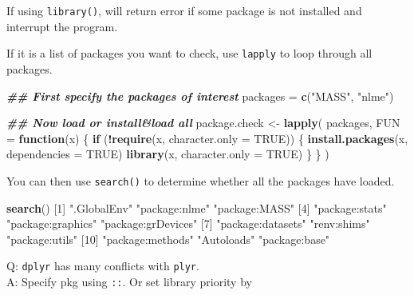 \documentclass[
  a4paper,
  twoside,
  openright]{book}
\newenvironment{Shaded}{\begin{snugshade}}{\end{snugshade}}
\newcommand{\AttributeTok}[1]{\textcolor[rgb]{0.13,0.29,0.53}{#1}}
\newcommand{\ConstantTok}[1]{\textcolor[rgb]{0.56,0.35,0.01}{#1}}
\newcommand{\ControlFlowTok}[1]{\textcolor[rgb]{0.13,0.29,0.53}{\textbf{#1}}}
\newcommand{\DecValTok}[1]{\textcolor[rgb]{0.00,0.00,0.81}{#1}}
\newcommand{\DocumentationTok}[1]{\textcolor[rgb]{0.56,0.35,0.01}{\textbf{\textit{#1}}}}
\newcommand{\FunctionTok}[1]{\textcolor[rgb]{0.13,0.29,0.53}{\textbf{#1}}}
\newcommand{\NormalTok}[1]{#1}
\newcommand{\OtherTok}[1]{\textcolor[rgb]{0.56,0.35,0.01}{#1}}
\newcommand{\SpecialCharTok}[1]{\textcolor[rgb]{0.81,0.36,0.00}{\textbf{#1}}}
\newcommand{\StringTok}[1]{\textcolor[rgb]{0.31,0.60,0.02}{#1}}
\theoremstyle{definition}
\theoremstyle{definition}
\theoremstyle{definition}
\theoremstyle{definition}
\theoremstyle{remark}
\begin{document}
If using \texttt{library()}, will return error if some package is not installed and interrupt the program.

If it is a list of packages you want to check, use \texttt{lapply} to loop through all packages.

\begin{Shaded}
\begin{Highlighting}[]
\DocumentationTok{\#\# First specify the packages of interest}
\NormalTok{packages }\OtherTok{=} \FunctionTok{c}\NormalTok{(}\StringTok{"MASS"}\NormalTok{, }\StringTok{"nlme"}\NormalTok{)}

\DocumentationTok{\#\# Now load or install\&load all}
\NormalTok{package.check }\OtherTok{\textless{}{-}} \FunctionTok{lapply}\NormalTok{(}
\NormalTok{  packages,}
  \AttributeTok{FUN =} \ControlFlowTok{function}\NormalTok{(x) \{}
    \ControlFlowTok{if}\NormalTok{ (}\SpecialCharTok{!}\FunctionTok{require}\NormalTok{(x, }\AttributeTok{character.only =} \ConstantTok{TRUE}\NormalTok{)) \{}
      \FunctionTok{install.packages}\NormalTok{(x, }\AttributeTok{dependencies =} \ConstantTok{TRUE}\NormalTok{)}
      \FunctionTok{library}\NormalTok{(x, }\AttributeTok{character.only =} \ConstantTok{TRUE}\NormalTok{)}
\NormalTok{    \}}
\NormalTok{  \}}
\NormalTok{)}
\end{Highlighting}
\end{Shaded}

You can then use \texttt{search()} to determine whether all the packages have loaded.

\begin{Shaded}
\begin{Highlighting}[]
\FunctionTok{search}\NormalTok{()}
\NormalTok{ [}\DecValTok{1}\NormalTok{] }\StringTok{".GlobalEnv"}        \StringTok{"package:nlme"}      \StringTok{"package:MASS"}     
\NormalTok{ [}\DecValTok{4}\NormalTok{] }\StringTok{"package:stats"}     \StringTok{"package:graphics"}  \StringTok{"package:grDevices"}
\NormalTok{ [}\DecValTok{7}\NormalTok{] }\StringTok{"package:datasets"}  \StringTok{"renv:shims"}        \StringTok{"package:utils"}    
\NormalTok{[}\DecValTok{10}\NormalTok{] }\StringTok{"package:methods"}   \StringTok{"Autoloads"}         \StringTok{"package:base"}     
\end{Highlighting}
\end{Shaded}

Q: \texttt{dplyr} has many conflicts with \texttt{plyr}.\\
A: Specify pkg using \texttt{::}. Or set library priority by
\end{document}
